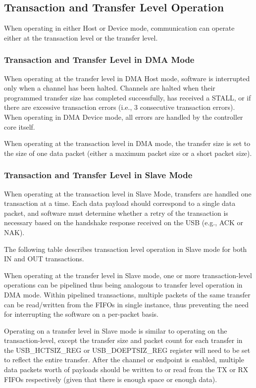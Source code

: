 \documentclass[main\_\_EN.tex]{subfiles}
\begin{document}
\subsection{Transaction and Transfer Level Operation}
When operating in either Host or Device mode, communication can operate either at the transaction level or the transfer level.

\subsubsection{Transaction and Transfer Level in DMA Mode}
When operating at the transfer level in DMA Host mode, software is interrupted only when a channel has been halted. Channels are halted when their programmed transfer size has completed successfully, has received a STALL, or if there are excessive transaction errors (i.e., 3 consecutive transaction errors). When operating in DMA Device mode, all errors are handled by the controller core itself.

When operating at the transaction level in DMA mode, the transfer size is set to the size of one data packet (either a maximum packet size or a short packet size).

\subsubsection{Transaction and Transfer Level in Slave Mode}
When operating at the transaction level in Slave Mode, transfers are handled one transaction at a time. Each data payload should correspond to a single data packet, and software must determine whether a retry of the transaction is necessary based on the handshake response received on the USB (e.g., ACK or NAK).

The following table describes transaction level operation in Slave mode for both IN and OUT transactions.

\clearpage


When operating at the transfer level in Slave mode, one or more transaction-level operations can be pipelined thus being analogous to transfer level operation in DMA mode. Within pipelined transactions, multiple packets of the same transfer can be read/written from the FIFOs in single instance, thus preventing the need for interrupting the software on a per-packet basis.

Operating on a transfer level in Slave mode is similar to operating on the transaction-level, except the transfer size and packet count for each transfer in the USB\_HCTSIZ\_REG or USB\_DOEPTSIZ\_REG register will need to be set to reflect the entire transfer. After the channel or endpoint is enabled, multiple data packets worth of payloads should be written to or read from the TX or RX FIFOs respectively (given that there is enough space or enough data).
\end{document}
